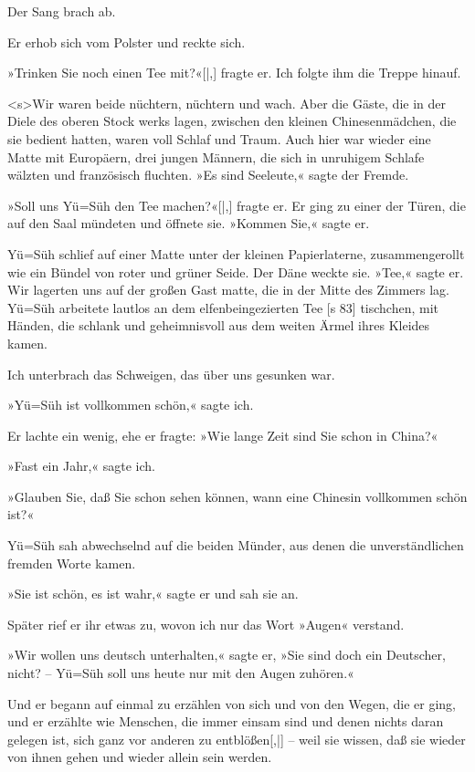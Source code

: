 Der Sang brach ab.

Er erhob sich vom Polster und reckte sich.

»Trinken Sie noch einen Tee mit?«[|,] fragte er.
Ich folgte ihm die Treppe hinauf.

<s>Wir waren beide nüchtern, nüchtern und wach.
Aber die Gäste, die in der Diele des oberen Stock­
werks lagen, zwischen den kleinen Chinesenmädchen,
die sie bedient hatten, waren voll Schlaf und Traum.
Auch hier war wieder eine Matte mit Europäern,
drei jungen Männern, die sich in unruhigem Schlafe
wälzten und französisch fluchten. »Es sind Seeleute,«
sagte der Frem­de.

»Soll uns Yü=Süh den Tee machen?«[|,] fragte er.
Er ging zu einer der Türen, die auf den Saal mündeten
und öffnete sie. »Kommen Sie,« sagte er.

Yü=Süh schlief auf einer Matte unter der kleinen
Papierlaterne, zusammengerollt wie ein Bündel von
roter und grüner Seide. Der Däne weckte sie. »Tee,«
sagte er. Wir lagerten uns auf der großen Gast­
matte, die in der Mitte des Zimmers lag. Yü=Süh
arbeitete lautlos an dem elfenbeingezierten Tee­
[s 83]
tischchen, mit Händen, die schlank und geheimnisvoll
aus dem weiten Ärmel ihres Kleides kamen.

Ich unterbrach das Schweigen, das über uns
gesunken war.

»Yü=Süh ist vollkommen schön,« sagte ich.

Er lachte ein wenig, ehe er fragte: »Wie lange
Zeit sind Sie schon in China?«

»Fast ein Jahr,« sagte ich.

»Glauben Sie, daß Sie schon sehen können,
wann eine Chinesin vollkommen schön ist?«

Yü=Süh sah abwechselnd auf die beiden Münder,
aus denen die unverständlichen fremden Worte kamen.

»Sie ist schön, es ist wahr,« sagte er und sah
sie an.

Später rief er ihr etwas zu, wovon ich nur das
Wort »Augen« verstand.

»Wir wollen uns deutsch unterhalten,« sagte er,
»Sie sind doch ein Deutscher, nicht? – Yü=Süh soll
uns heute nur mit den Augen zuhören.«

Und er begann auf einmal zu erzählen von sich
und von den Wegen, die er ging, und er erzählte
wie Menschen, die immer einsam sind und denen
nichts daran gelegen ist, sich ganz vor anderen zu
entblößen[,|] – weil sie wissen, daß sie wieder von
ihnen gehen und wieder allein sein werden.

